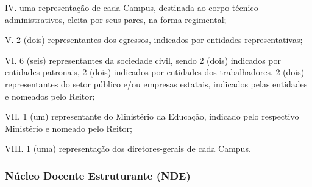 IV.	uma representação de cada Campus, destinada ao corpo técnico-administrativos, eleita por seus pares, na forma regimental;

V.	2 (dois) representantes dos egressos, indicados por entidades representativas;

VI.	6 (seis) representantes da sociedade civil, sendo 2 (dois) indicados por entidades patronais, 2 (dois) indicados por entidades dos trabalhadores, 2 (dois) representantes do setor público e/ou empresas estatais, indicados pelas entidades e nomeados pelo Reitor;

VII.	1 (um) representante do Ministério da Educação, indicado pelo respectivo Ministério e nomeado pelo Reitor;

VIII.	1 (uma) representação dos diretores-gerais de cada Campus.

\subsubsection{Núcleo Docente Estruturante (NDE)}


